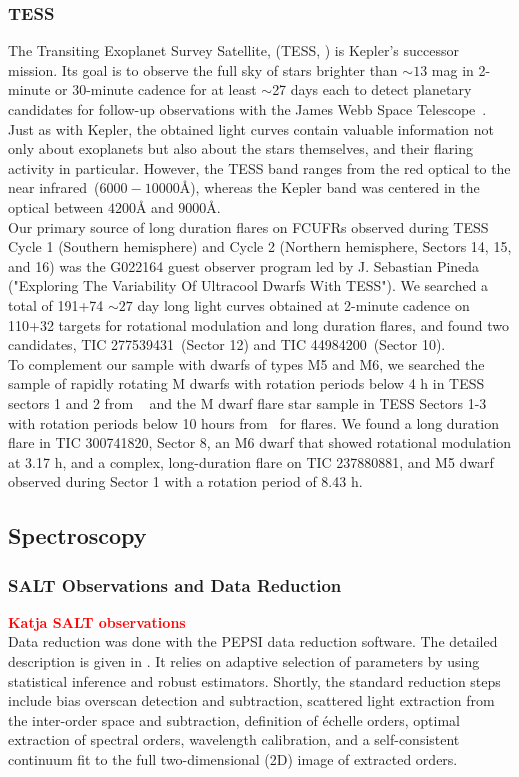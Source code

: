 \documentclass[fleqn,usenatbib,letters]{mnras}%
\newcommand{\FA}{TIC 277539431} %
\newcommand{\FB}{TIC 44984200} %
\newcommand{\FC}{TIC 237880881} %
\newcommand{\FF}{TIC 300741820} %
\begin{document}
\subsubsection{TESS}
\label{sec:photometryTESS}
The Transiting Exoplanet Survey Satellite, (TESS, \citealt{ricker2015}) is Kepler's successor mission. Its goal is to observe the full sky of stars brighter than $\sim13$ mag in 2-minute or 30-minute cadence for at least $\sim$27 days each to detect planetary candidates for follow-up observations with the James Webb Space Telescope~\citep{gardner2006}. Just as with Kepler, the obtained light curves contain valuable information not only about exoplanets but also about the stars themselves, and their flaring activity in particular. However, the TESS band ranges from the red optical to the near infrared~($6000-10000$\AA), whereas the Kepler band was centered in the optical between $4200$\AA\; and $9000$\AA.
\\
Our primary source of long duration flares on FCUFRs observed during TESS Cycle 1 (Southern hemisphere) and Cycle 2 (Northern hemisphere, Sectors 14, 15, and 16) was the G022164 guest observer program led by J. Sebastian Pineda ("Exploring The Variability Of Ultracool Dwarfs With TESS"). We searched a total of 191+74 $\sim 27$ day long light curves obtained at 2-minute cadence on 110+32 targets for rotational modulation and long duration flares, and found two candidates, \FA~(Sector 12) and \FB~(Sector 10).
\\
To complement our sample with dwarfs of types M5 and M6, we searched the sample of rapidly rotating M dwarfs with rotation periods below 4 h in TESS sectors 1 and 2 from ~\citet{zhan2019} and the M dwarf flare star sample in TESS Sectors 1-3 with rotation periods below 10 hours from~\citet{doyle2019} for flares. We found a long duration flare in \FF, Sector 8, an M6 dwarf that showed rotational modulation at 3.17 h, and a complex, long-duration flare on \FC, and M5 dwarf observed during Sector 1 with a rotation period of 8.43 h.
\subsection{Spectroscopy}
\label{sec:salt}
\subsubsection{SALT Observations and Data Reduction}
\textcolor{red}{\textbf{Katja SALT observations}}
\\
Data reduction was done with the PEPSI data reduction software. The detailed description is given in
\citet{2018Strassmeier}.
It relies on adaptive selection of parameters by using statistical inference
and robust estimators. Shortly, the standard reduction steps include bias overscan
detection and subtraction, scattered light extraction from the inter-order
space and subtraction, definition of \'echelle orders, optimal extraction of
spectral orders, wavelength calibration, and a self-consistent continuum fit
to the full two-dimensional (2D) image of extracted orders.
\end{document}
